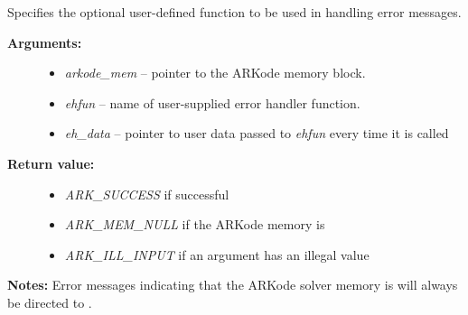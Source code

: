 \documentclass[letterpaper,10pt,english]{sphinxmanual}
\begin{document}
\begin{fulllineitems}
\label{c_interface/User_callable:c.ARKodeSetErrHandlerFn}
Specifies the optional user-defined function to be used
in handling error messages.
\begin{description}
\item[{\textbf{Arguments:}}] \leavevmode\begin{itemize}
\item {} 
\emph{arkode\_mem} -- pointer to the ARKode memory block.

\item {} 
\emph{ehfun} -- name of user-supplied error handler function.

\item {} 
\emph{eh\_data} -- pointer to user data passed to \emph{ehfun} every time
it is called

\end{itemize}

\item[{\textbf{Return value:}}] \leavevmode\begin{itemize}
\item {} 
\emph{ARK\_SUCCESS} if successful

\item {} 
\emph{ARK\_MEM\_NULL} if the ARKode memory is 

\item {} 
\emph{ARK\_ILL\_INPUT} if an argument has an illegal value

\end{itemize}

\end{description}

\textbf{Notes:} Error messages indicating that the ARKode solver memory is
 will always be directed to .

\end{fulllineitems}

\end{document}
